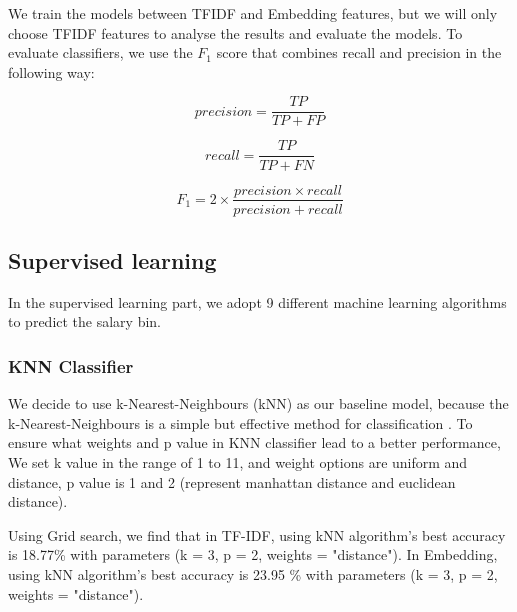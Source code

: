 \documentclass[11pt]{article}
\begin{document}
We train the models between TFIDF and Embedding features, but we will only choose TFIDF features to analyse the results and evaluate the models.
To evaluate classifiers, we use the $F_1$ score that combines recall and precision in the following way: \cite{TAN2006290}

\begin{equation}
    precision = \frac{TP}{TP + FP}
\end{equation}

\begin{equation}
    recall = \frac{TP}{TP + FN}
\end{equation}

\begin{equation}
    F_1 = 2 \times \frac{precision \times recall}{precision + recall}
\end{equation}









\subsection{Supervised learning}
In the supervised learning part, we adopt 9 different machine learning algorithms to predict the salary bin.


\subsubsection{KNN Classifier}
We decide to use k-Nearest-Neighbours (kNN) as our baseline model, because the k-Nearest-Neighbours is a simple but effective method for classification \cite{10.1007/978-3-540-39964-3_62}.
To ensure what weights and p value in KNN classifier lead to a better performance, We set k value in the range of 1 to 11,
and weight options are uniform and distance,
p value is 1 and 2 (represent manhattan distance and euclidean distance).


Using Grid search, we find that in TF-IDF, using kNN algorithm's best accuracy is 18.77\% with parameters (k = 3, p = 2, weights = "distance").
In Embedding, using kNN algorithm's best accuracy is 23.95 \% with parameters (k = 3, p = 2, weights = "distance").
\end{document}
